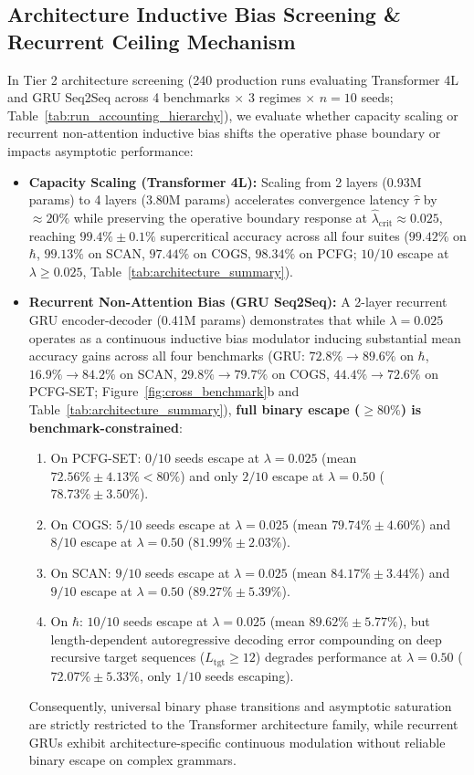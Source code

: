 \documentclass{article}
\theoremstyle{plain}
\theoremstyle{definition}
\begin{document}
\subsection{Architecture Inductive Bias Screening \& Recurrent Ceiling Mechanism}
In Tier 2 architecture screening (240 production runs evaluating Transformer 4L and GRU Seq2Seq across 4 benchmarks $\times$ 3 regimes $\times$ $n=10$ seeds; Table~\ref{tab:run_accounting_hierarchy}), we evaluate whether capacity scaling or recurrent non-attention inductive bias shifts the operative phase boundary or impacts asymptotic performance:
\begin{itemize}[leftmargin=*,noitemsep]
    \item \textbf{Capacity Scaling (Transformer 4L):} Scaling from 2 layers (0.93M params) to 4 layers (3.80M params) accelerates convergence latency $\hat{\tau}$ by $\approx 20\%$ while preserving the operative boundary response at $\hat{\lambda}_{\text{crit}} \approx 0.025$, reaching $99.4\% \pm 0.1\%$ supercritical accuracy across all four suites ($99.42\%$ on $\hbar$, $99.13\%$ on SCAN, $97.44\%$ on COGS, $98.34\%$ on PCFG; $10/10$ escape at $\lambda \ge 0.025$, Table~\ref{tab:architecture_summary}).
    \item \textbf{Recurrent Non-Attention Bias (GRU Seq2Seq):} A 2-layer recurrent GRU encoder-decoder (0.41M params) demonstrates that while $\lambda = 0.025$ operates as a continuous inductive bias modulator inducing substantial mean accuracy gains across all four benchmarks (GRU: $72.8\% \to 89.6\%$ on $\hbar$, $16.9\% \to 84.2\%$ on SCAN, $29.8\% \to 79.7\%$ on COGS, $44.4\% \to 72.6\%$ on PCFG-SET; Figure~\ref{fig:cross_benchmark}b and Table~\ref{tab:architecture_summary}), \textbf{full binary escape ($\ge 80\%$) is benchmark-constrained}:
    \begin{enumerate}[label=(\alph*),noitemsep]
        \item On PCFG-SET: $0/10$ seeds escape at $\lambda=0.025$ (mean $72.56\% \pm 4.13\% < 80\%$) and only $2/10$ escape at $\lambda=0.50$ ($78.73\% \pm 3.50\%$).
        \item On COGS: $5/10$ seeds escape at $\lambda=0.025$ (mean $79.74\% \pm 4.60\%$) and $8/10$ escape at $\lambda=0.50$ ($81.99\% \pm 2.03\%$).
        \item On SCAN: $9/10$ seeds escape at $\lambda=0.025$ (mean $84.17\% \pm 3.44\%$) and $9/10$ escape at $\lambda=0.50$ ($89.27\% \pm 5.39\%$).
        \item On $\hbar$: $10/10$ seeds escape at $\lambda=0.025$ (mean $89.62\% \pm 5.77\%$), but length-dependent autoregressive decoding error compounding on deep recursive target sequences ($L_{\text{tgt}} \ge 12$) degrades performance at $\lambda=0.50$ ($72.07\% \pm 5.33\%$, only $1/10$ seeds escaping).
    \end{enumerate}
    Consequently, universal binary phase transitions and asymptotic saturation are strictly restricted to the Transformer architecture family, while recurrent GRUs exhibit architecture-specific continuous modulation without reliable binary escape on complex grammars.
\end{itemize}
\end{document}
